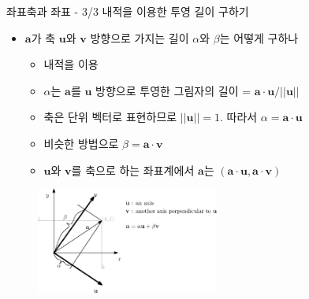 \begin{frame}{좌표축과 좌표 - 3/3 내적을 이용한 투영 길이 구하기}

\begin{itemize}
\item $\mathbf a$가 축 $\mathbf u$와 $\mathbf v$ 방향으로 가지는 길이 $\alpha$와 $\beta$는 어떻게 구하나
	\begin{itemize}
	\item 내적을 이용
	\item $\alpha$는 $\mathbf a$를 $\mathbf u$ 방향으로 투영한 그림자의 길이 =  $\mathbf a \cdot \mathbf u / || \mathbf u ||$
	\item 축은 단위 벡터로 표현하므로 $||\mathbf u||=1$. 따라서 $\alpha = \mathbf a \cdot \mathbf u$
	\item 비슷한 방법으로 $\beta = \mathbf a \cdot \mathbf v$
	\item $\mathbf u$와 $\mathbf v$를 축으로 하는 좌표계에서 $\mathbf a$는 $(\mathbf a \cdot \mathbf u, \mathbf a \cdot \mathbf v)$
	\end{itemize}
\end{itemize}

\begin{figure}
\includegraphics[width=6cm]{Math_vector/vectorComponentsArb.eps}
\end{figure}

\end{frame}


